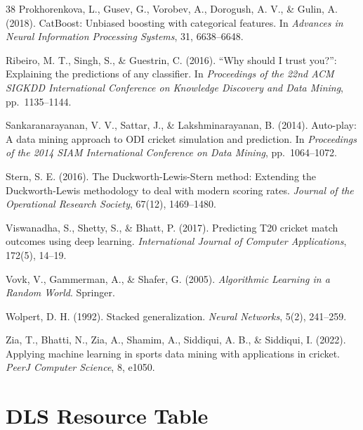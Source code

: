 \documentclass[10pt,a4paper,twocolumn]{article}
\begin{document}
\begin{thebibliography}{38}
Prokhorenkova, L., Gusev, G., Vorobev, A., Dorogush, A. V., \& Gulin, A. (2018).
\newblock CatBoost: Unbiased boosting with categorical features.
\newblock In \textit{Advances in Neural Information Processing Systems}, 31, 6638--6648.

Ribeiro, M. T., Singh, S., \& Guestrin, C. (2016).
\newblock ``Why should I trust you?'': Explaining the predictions of any classifier.
\newblock In \textit{Proceedings of the 22nd ACM SIGKDD International Conference on Knowledge Discovery and Data Mining}, pp.\ 1135--1144.

Sankaranarayanan, V. V., Sattar, J., \& Lakshminarayanan, B. (2014).
\newblock Auto-play: A data mining approach to ODI cricket simulation and prediction.
\newblock In \textit{Proceedings of the 2014 SIAM International Conference on Data Mining}, pp.\ 1064--1072.

Stern, S. E. (2016).
\newblock The Duckworth-Lewis-Stern method: Extending the Duckworth-Lewis methodology to deal with modern scoring rates.
\newblock \textit{Journal of the Operational Research Society}, 67(12), 1469--1480.

Viswanadha, S., Shetty, S., \& Bhatt, P. (2017).
\newblock Predicting T20 cricket match outcomes using deep learning.
\newblock \textit{International Journal of Computer Applications}, 172(5), 14--19.

Vovk, V., Gammerman, A., \& Shafer, G. (2005).
\newblock \textit{Algorithmic Learning in a Random World}.
\newblock Springer.

Wolpert, D. H. (1992).
\newblock Stacked generalization.
\newblock \textit{Neural Networks}, 5(2), 241--259.

Zia, T., Bhatti, N., Zia, A., Shamim, A., Siddiqui, A. B., \& Siddiqui, I. (2022).
\newblock Applying machine learning in sports data mining with applications in cricket.
\newblock \textit{PeerJ Computer Science}, 8, e1050.

\end{thebibliography}

\appendix
\section{DLS Resource Table}
\label{app:dls}
\end{document}
